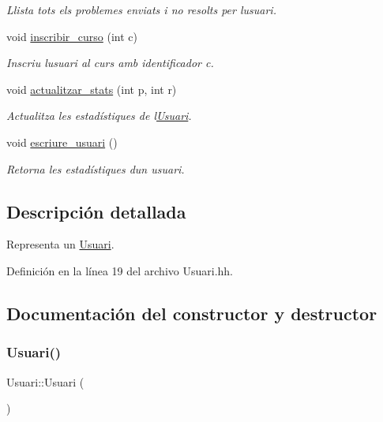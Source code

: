 \begin{DoxyCompactItemize}
\begin{DoxyCompactList}\small\item\em Llista tots els problemes enviats i no resolts per l\textquotesingle{}usuari. \end{DoxyCompactList}\item 
void \mbox{\hyperlink{class_usuari_af7f2d183e02eec8428bf48df89efb763}{inscribir\+\_\+curso}} (int c)
\begin{DoxyCompactList}\small\item\em Inscriu l\textquotesingle{}usuari al curs amb identificador c. \end{DoxyCompactList}\item 
void \mbox{\hyperlink{class_usuari_ab47d77ad6eb5d9139f464c226fca2af4}{actualitzar\+\_\+stats}} (int p, int r)
\begin{DoxyCompactList}\small\item\em Actualitza les estadístiques de l\textquotesingle{}\mbox{\hyperlink{class_usuari}{Usuari}}. \end{DoxyCompactList}\item 
void \mbox{\hyperlink{class_usuari_a19ce3acaf6693208eed30686bd79c30e}{escriure\+\_\+usuari}} ()
\begin{DoxyCompactList}\small\item\em Retorna les estadístiques d\textquotesingle{}un usuari. \end{DoxyCompactList}\end{DoxyCompactItemize}


\subsection{Descripción detallada}
Representa un \mbox{\hyperlink{class_usuari}{Usuari}}. 

Definición en la línea 19 del archivo Usuari.\+hh.



\subsection{Documentación del constructor y destructor}
\mbox{\label{class_usuari_ac6a1fbc3d6967c6de677580c60dfaaf4}} 
\subsubsection{\texorpdfstring{Usuari()}{Usuari()}\hspace{0.1cm}{\footnotesize\ttfamily [1/2]}}
{\footnotesize\ttfamily Usuari\+::\+Usuari (\begin{DoxyParamCaption}{ }\end{DoxyParamCaption})}



